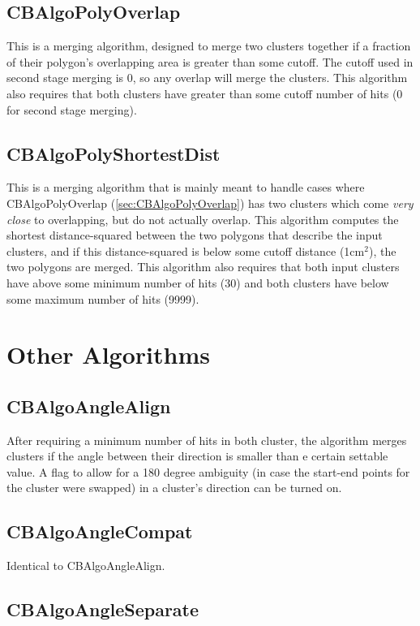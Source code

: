 \documentclass{article}
\begin{document}
\subsection{CBAlgoPolyOverlap}\label{sec:CBAlgoPolyOverlap}
This is a merging algorithm, designed to merge two clusters together if a fraction of their polygon's overlapping area is 
greater than some cutoff. The cutoff used in second stage merging is 0, so any overlap will merge the clusters. This 
algorithm also requires that both clusters have greater than some cutoff number of hits (0 for second stage merging).

\subsection{CBAlgoPolyShortestDist}\label{sec:CBAlgoPolyShortestDist}
This is a merging algorithm that is mainly meant to handle cases where CBAlgoPolyOverlap (\autoref{sec:CBAlgoPolyOverlap}) 
has two clusters which come \textit{very close} to overlapping, but do not actually overlap. This algorithm computes the
shortest distance-squared between the two polygons that describe the input clusters, and if this distance-squared is below
some cutoff distance (1cm$^2$), the two polygons are merged. This algorithm also requires that both input clusters have 
above some minimum number of hits (30) and both clusters have below some maximum number of hits (9999).
\section{Other Algorithms}

\subsection{CBAlgoAngleAlign}\label{sec:CBAlgoAngleAlign}
After requiring a minimum number of hits in both cluster, the algorithm merges clusters if the angle between their
direction is smaller than e certain settable value. A flag to allow for a 180 degree ambiguity (in case the start-end
points for the cluster were swapped) in a cluster's direction can be turned on.
\subsection{CBAlgoAngleCompat}\label{sec:CBAlgoAngleCompat}
Identical to CBAlgoAngleAlign.
\subsection{CBAlgoAngleSeparate}\label{sec:CBAlgoAngleSeparate}
\end{document}
